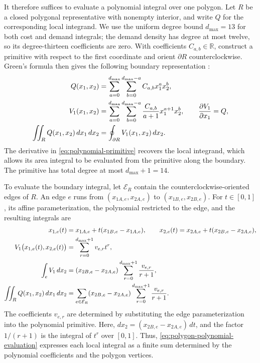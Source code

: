 \documentclass[a4paper,fleqn]{cas-sc}
\theoremstyle{remark}
\theoremstyle{plain}
\begin{document}
It therefore suffices to evaluate a polynomial integral over one polygon. Let $R$ be a closed polygonal representative with nonempty interior, and write $Q$ for the corresponding local integrand. We use the uniform degree bound $d_{\max}=13$ for both cost and demand integrals; the demand density has degree at most twelve, so its degree-thirteen coefficients are zero. With coefficients $C_{a,b}\in\mathbb R$, construct a primitive with respect to the first coordinate and orient $\partial R$ counterclockwise. Green's formula then gives the following boundary representation \citep{sommariva2007gauss}:
\begin{subequations}\label{eq:green-polynomial-integral}
\allowdisplaybreaks[0]
\begin{align}
    Q(x_1,x_2)&=\sum_{a=0}^{d_{\max}}\sum_{b=0}^{d_{\max}-a}C_{a,b}x_1^a x_2^b,\label{eq:local-polynomial-expansion}\\
    V_1(x_1,x_2)&=\sum_{a=0}^{d_{\max}}\sum_{b=0}^{d_{\max}-a}\frac{C_{a,b}}{a+1}x_1^{a+1}x_2^b,\qquad \frac{\partial V_1}{\partial x_1}=Q,\label{eq:polynomial-primitive}\\
    \iint_R Q(x_1,x_2)\,dx_1\,dx_2&=\oint_{\partial R}V_1(x_1,x_2)\,dx_2.\label{eq:green-boundary-integral}
\end{align}
\end{subequations}
The derivative in \eqref{eq:polynomial-primitive} recovers the local integrand, which allows its area integral to be evaluated from the primitive along the boundary. The primitive has total degree at most $d_{\max}+1=14$.

To evaluate the boundary integral, let $\mathcal E_R$ contain the counterclockwise-oriented edges of $R$. An edge $e$ runs from $(x_{1A,e},x_{2A,e})$ to $(x_{1B,e},x_{2B,e})$. For $t\in[0,1]$, its affine parameterization, the polynomial restricted to the edge, and the resulting integrals are
\begin{subequations}\label{eq:edge-polynomial-evaluation}
\allowdisplaybreaks[0]
\begin{align}
    x_{1,e}(t)&=x_{1A,e}+t(x_{1B,e}-x_{1A,e}),\qquad x_{2,e}(t)=x_{2A,e}+t(x_{2B,e}-x_{2A,e}),\notag\\
    V_1\bigl(x_{1,e}(t),x_{2,e}(t)\bigr)&=\sum_{r=0}^{d_{\max}+1}v_{e,r}t^r,\label{eq:edge-polynomial-restriction}\\
    \int_e V_1\,dx_2&=(x_{2B,e}-x_{2A,e})\sum_{r=0}^{d_{\max}+1}\frac{v_{e,r}}{r+1},\label{eq:edge-integral-evaluation}\\
    \iint_R Q(x_1,x_2)\,dx_1\,dx_2&=\sum_{e\in\mathcal E_R}(x_{2B,e}-x_{2A,e})\sum_{r=0}^{d_{\max}+1}\frac{v_{e,r}}{r+1}.\label{eq:polygon-polynomial-evaluation}
\end{align}
\end{subequations}
The coefficients $v_{e,r}$ are determined by substituting the edge parameterization into the polynomial primitive. Here, $dx_2=(x_{2B,e}-x_{2A,e})\,dt$, and the factor $1/(r+1)$ is the integral of $t^r$ over $[0,1]$. Thus, \eqref{eq:polygon-polynomial-evaluation} expresses each local integral as a finite sum determined by the polynomial coefficients and the polygon vertices.
\end{document}
